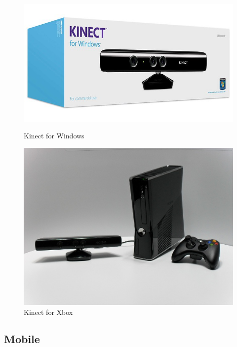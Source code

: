 \begin{figure}[H]
\begin{minipage}[b]{0.5\linewidth}
\centering
\includegraphics[scale=0.3,keepaspectratio=true]{Conclusions_and_Future/kinect_windows.jpg}
\caption{Kinect for Windows}
\label{fig:kinect_windows}
\end{minipage}
\hspace{0.5cm}
\begin{minipage}[b]{0.5\linewidth}
\centering
\includegraphics[scale=0.3,keepaspectratio=true]{Conclusions_and_Future/kinect_xbox.jpg}
\caption{Kinect for Xbox}
\label{fig:kinect_xbox}
\end{minipage}
\end{figure}

\subsection{Mobile}


